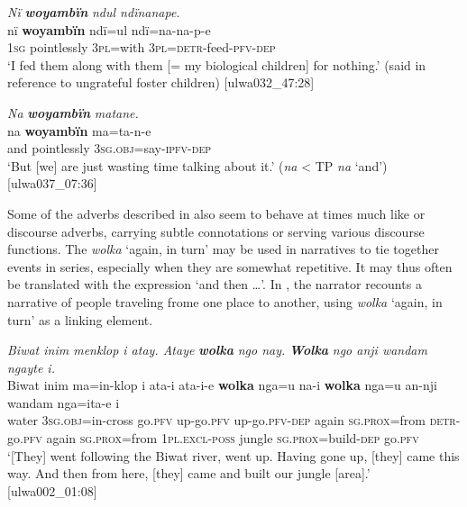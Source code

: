 \ea%
    \label{ex:otherwc:137}
          \textit{Nï} \textbf{\textit{woyambïn}} \textit{ndul ndïnanape.}\\
\gll    nï    \textbf{woyambïn}  ndï=ul    ndï=na-na-p-e\\
    1\textsc{sg}  pointlessly    3\textsc{pl}=with  3\textsc{pl}=\textsc{detr}{}-feed-\textsc{pfv-dep}\\
\glt `I fed them along with them [= my biological children] for nothing.’ (said in reference to ungrateful foster children) [ulwa032\_47:28]
\z

\ea%
    \label{ex:otherwc:138}
          \textit{Na} \textbf{\textit{woyambïn}} \textit{matane.}\\
\gll na    \textbf{woyambïn}  ma=ta-n-e\\
    and    pointlessly    3\textsc{sg.obj}=say-\textsc{ipfv-dep}\\
\glt `But [we] are just wasting time talking about it.’ (\textit{na} < TP \textit{na} ‘and’) [ulwa037\_07:36]
\z

Some of the adverbs described in  also seem to behave at times much like  or discourse adverbs, carrying subtle connotations or serving various discourse functions. The  \textit{wolka} ‘again, in turn’ may be used in narratives to tie together events in series, especially when they are somewhat repetitive. It may thus often be translated with the  expression ‘and then …’. In , the narrator recounts a narrative of people traveling frome one place to another, using \textit{wolka} ‘again, in turn’ as a linking element.


\newpage


\ea%
    \label{ex:otherwc:139}
          \textit{Biwat inim menklop i atay. Ataye} \textbf{\textit{wolka}} \textit{ngo nay.} \textbf{\textit{Wolka}} \textit{ngo anji wandam ngayte i.}\\
\gll    Biwat  inim  ma=in-klop    i    ata-i    ata-i-e \textbf{wolka}  nga=u        na-i       \textbf{wolka}  nga=u     an-nji        wandam  nga=ita-e        i\\
    [place]  water  3\textsc{sg.obj}=in-cross  go.\textsc{pfv}  up-go.\textsc{pfv}  up-go\textsc{.pfv-dep} again  \textsc{sg.prox}=from  \textsc{detr}{}-go.\textsc{pfv}  again  \textsc{sg.prox}=from    1\textsc{pl.excl-poss}  jungle    \textsc{sg.prox}=build-\textsc{dep}  go.\textsc{pfv}\\
\glt `[They] went following the Biwat river, went up. Having gone up, [they] came this way. And then from here, [they] came and built our jungle [area].’ [ulwa002\_01:08]
\z

